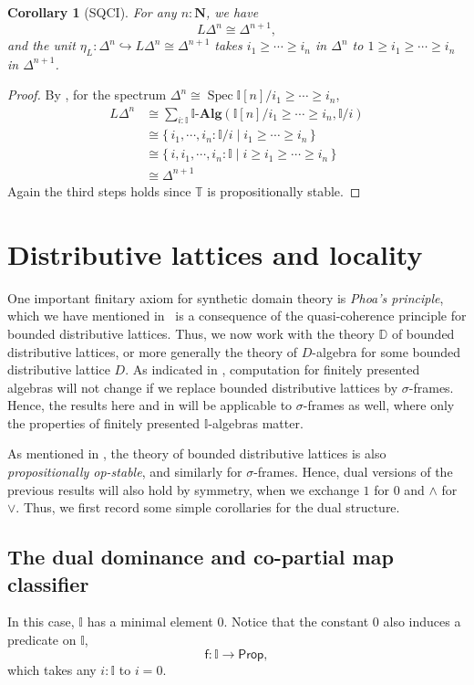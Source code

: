 \documentclass[a4paper,12pt]{amsart}
\newtheorem{corollary}[theorem]{Corollary}
\theoremstyle{definition}
\newcommand{\mb}[1]{\mathbf{#1}}
\newcommand{\mbb}[1]{\mathbb{#1}}
\newcommand{\T}{\mbb T}
\newcommand{\I}{\mbb I}
\newcommand{\ms}[1]{\mathsf{#1}}
\newcommand{\alg}{\text{-}\mb{Alg}}
\newcommand{\scomp}[2]{\{\,#1\mid#2\,\}}
\newcommand{\hook}{\hookrightarrow}
\newcommand{\N}{\mb N}
\newcommand{\pp}{\ms{Prop}}
\newcommand{\spec}{\operatorname{Spec}}
\begin{document}
\begin{corollary}[SQCI]
  For any $n : \N$, we have
  \[ L\Delta^n \cong \Delta^{n+1}, \]
  and the unit $\eta_L \colon \Delta^n \hook L\Delta^n \cong \Delta^{n+1}$ takes $i_1 \ge \cdots \ge i_n$ in $\Delta^n$ to $1 \ge i_1 \ge \cdots \ge i_n$ in $\Delta^{n+1}$. 
\end{corollary}
\begin{proof}
  By , for the spectrum $\Delta^n \cong \spec\I[n]/i_1 \ge \cdots \ge i_n$,
  \begin{align*}
    L\Delta^n
    &\cong \sum_{i:\I}\I\alg(\I[n]/i_1\ge\cdots\ge i_n,\I/i) \\
    &\cong \scomp{i_1,\cdots,i_n:\I/i}{i_1 \ge \cdots \ge i_n} \\
    &\cong \scomp{i,i_1,\cdots,i_n:\I}{i \ge i_1 \ge \cdots \ge i_n} \\
    &\cong \Delta^{n+1}
  \end{align*}
  Again the third steps holds since $\T$ is propositionally stable.
\end{proof}

\section{Distributive lattices and locality}\label{sec:locality}

One important finitary axiom for synthetic domain theory is \emph{Phoa's principle}, which we have mentioned in~ is a consequence of the quasi-coherence principle for bounded distributive lattices. 
Thus, we now work with the theory $\mbb D$ of bounded distributive lattices, or more generally the theory of $D$-algebra for some bounded distributive lattice $D$. As indicated in , computation for finitely presented algebras 
will not change if we replace bounded distributive lattices by $\sigma$-frames. Hence, the results here and in  will be applicable to $\sigma$-frames as well, where only the properties of finitely presented $\I$-algebras matter.

As mentioned in , the theory of bounded distributive lattices is also \emph{propositionally op-stable}, and similarly for $\sigma$-frames. Hence, dual versions of the previous results will also hold by symmetry, when we exchange $1$ for $0$ and $\wedge$ for $\vee$. Thus, we first record some simple corollaries for the dual structure.

\subsection{The dual dominance and co-partial map classifier}
In this case, $\I$ has a minimal element $0$. Notice that the constant $0$ also induces a predicate on $\I$,
\[ \ms f \colon \I \to \pp, \]
which takes any $i : \I$ to $i = 0$. 
\end{document}
